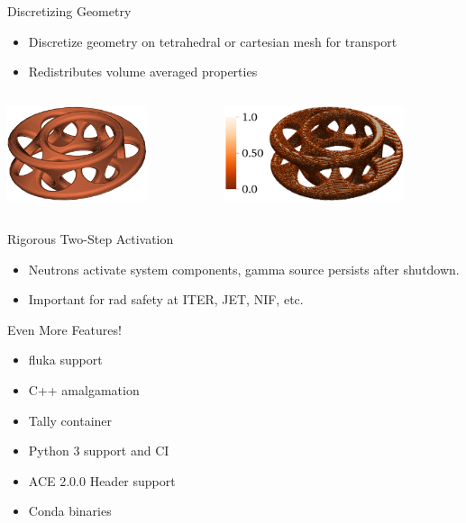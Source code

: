 \documentclass[xcolor=x11names,compress]{beamer}
\renewcommand{\(}{\begin{columns}}
\renewcommand{\)}{\end{columns}}
\newcommand{\<}[1]{\begin{column}{#1}}
\renewcommand{\>}{\end{column}}
\begin{document}
\begin{frame}{Discretizing Geometry}
    \begin{itemize}
        \item Discretize geometry on tetrahedral or cartesian mesh for transport
        \item Redistributes volume averaged properties
    \end{itemize}
    \begin{columns}
        \begin{column}{0.45\textwidth}
            \includegraphics[height=1.1in,clip]{mobius_cad.png}  
  	    \end{column}
 	    \begin{column}{0.45\textwidth}
            \includegraphics[height=1.1in,clip]{mobius_mesh.png}  
        \end{column}
    \end{columns}
\end{frame}

\begin{frame}{Rigorous Two-Step Activation}
    \begin{itemize}
        \item Neutrons activate system components, gamma source persists after shutdown.
        \item Important for rad safety at ITER, JET, NIF, etc.
    \end{itemize}  
\end{frame}
\begin{frame}{Even More Features!}
    \begin{itemize}
        \item fluka support
        \item C++ amalgamation 
        \item Tally container
        \item Python 3 support and CI
        \item ACE 2.0.0 Header support
        \item Conda binaries
    \end{itemize}
\end{frame}
\end{document}
